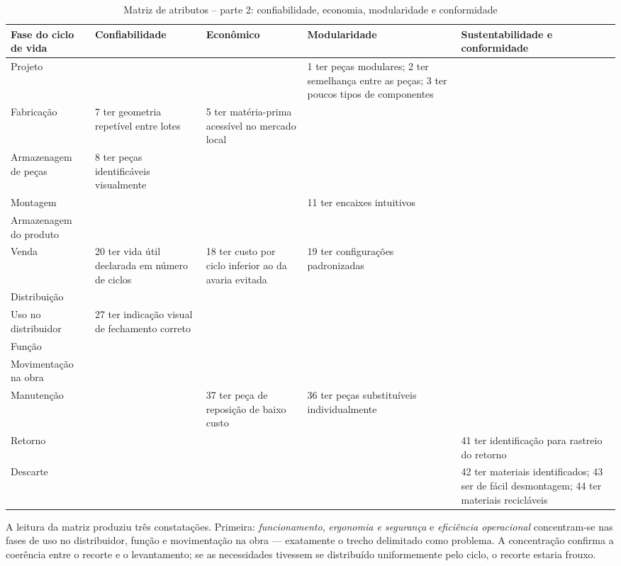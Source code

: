 \clearpage
\begin{table}[H]
\caption{Matriz de atributos -- parte 2: confiabilidade, economia, modularidade e conformidade}
\label{tab:matriz-atributos-2}
\centering
\scriptsize
\begin{tabularx}{\textwidth}{@{}L{2.35cm}@{\hspace{0.22cm}}Y@{\hspace{0.22cm}}Y@{\hspace{0.22cm}}Y@{\hspace{0.22cm}}Y@{}}
\toprule
\textbf{Fase do ciclo de vida} & \textbf{Confiabilidade} & \textbf{Econômico} & \textbf{Modularidade} & \textbf{Sustentabilidade e conformidade} \\
\midrule
Projeto &  &  & 1 ter peças modulares; 2 ter semelhança entre as peças; 3 ter poucos tipos de componentes &  \\
Fabricação & 7 ter geometria repetível entre lotes & 5 ter matéria-prima acessível no mercado local &  &  \\
Armazenagem de peças & 8 ter peças identificáveis visualmente &  &  &  \\
Montagem &  &  & 11 ter encaixes intuitivos &  \\
Armazenagem do produto &  &  &  &  \\
Venda & 20 ter vida útil declarada em número de ciclos & 18 ter custo por ciclo inferior ao da avaria evitada & 19 ter configurações padronizadas &  \\
Distribuição &  &  &  &  \\
Uso no distribuidor & 27 ter indicação visual de fechamento correto &  &  &  \\
Função &  &  &  &  \\
Movimentação na obra &  &  &  &  \\
Manutenção &  & 37 ter peça de reposição de baixo custo & 36 ter peças substituíveis individualmente &  \\
Retorno &  &  &  & 41 ter identificação para rastreio do retorno \\
Descarte &  &  &  & 42 ter materiais identificados; 43 ser de fácil desmontagem; 44 ter materiais recicláveis \\
\bottomrule
\end{tabularx}
\end{table}

A leitura da matriz produziu três constatações. Primeira: \textit{funcionamento}, \textit{ergonomia e segurança} e \textit{eficiência operacional} concentram-se nas fases de uso no distribuidor, função e movimentação na obra --- exatamente o trecho delimitado como problema. A concentração confirma a coerência entre o recorte e o levantamento; se as necessidades tivessem se distribuído uniformemente pelo ciclo, o recorte estaria frouxo.

